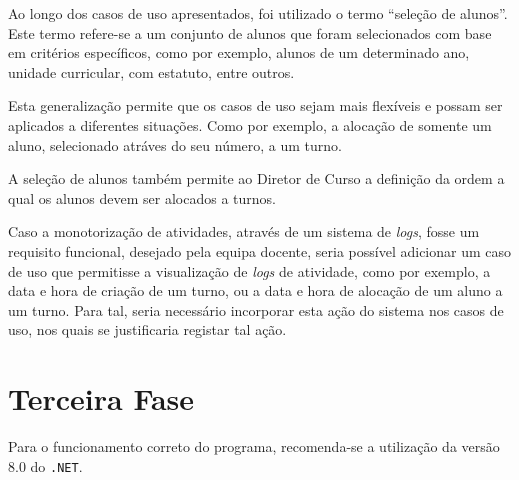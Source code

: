 \documentclass[a4paper,12pt]{scrreprt}
\begin{document}
Ao longo dos casos de uso apresentados, foi utilizado o termo “seleção de alunos”.
Este termo refere-se a um conjunto de alunos que foram selecionados com base em critérios específicos,
como por exemplo, alunos de um determinado ano, unidade curricular, com estatuto, entre outros.

Esta generalização permite que os casos de uso sejam mais flexíveis
e possam ser aplicados a diferentes situações. Como por exemplo, a alocação de somente
um aluno, selecionado atráves do seu número, a um turno.

A seleção de alunos também permite ao Diretor de Curso a definição da ordem
a qual os alunos devem ser alocados a turnos.

\vspace{1cm}

Caso a monotorização de atividades, através de um sistema de \textit{logs}, fosse um requisito funcional,
desejado pela equipa docente, seria possível adicionar um caso de uso que permitisse a visualização
de \textit{logs} de atividade, como por exemplo, a data e hora de criação de um turno,
ou a data e hora de alocação de um aluno a um turno. Para tal, seria necessário
incorporar esta ação do sistema nos casos de uso, nos quais se justificaria registar tal ação.

\section{Terceira Fase}

Para o funcionamento correto do programa, recomenda-se a utilização da versão 8.0 do \texttt{.NET}.





%
%


\end{document}
